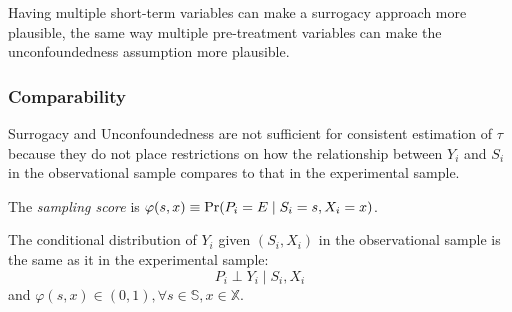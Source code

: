 \begin{note}
    Having multiple short-term variables can make a surrogacy approach more plausible, the same way multiple pre-treatment variables can make the unconfoundedness assumption more plausible.
\end{note}


\subsubsection*{Comparability}
Surrogacy and Unconfoundedness are not sufficient for consistent estimation of $\tau$ because they do not place restrictions on how the relationship between $Y_i$ and $S_i$ in the observational sample compares to that in the experimental sample.
\begin{definition}
    The \textit{sampling score} is $\varphi(s,x)\equiv \textnormal{Pr}(P_i=E\mid S_i=s,X_i=x)$.
\end{definition}

\begin{assumption}
    The conditional distribution of $Y_i$ given $(S_i, X_i)$ in the observational sample is the same as it in the experimental sample:
    $$P_i\perp Y_i\mid S_i,X_i$$
    and $\varphi(s,x)\in (0,1),\forall s\in \mathbb{S},x\in \mathbb{X}$.
\end{assumption}